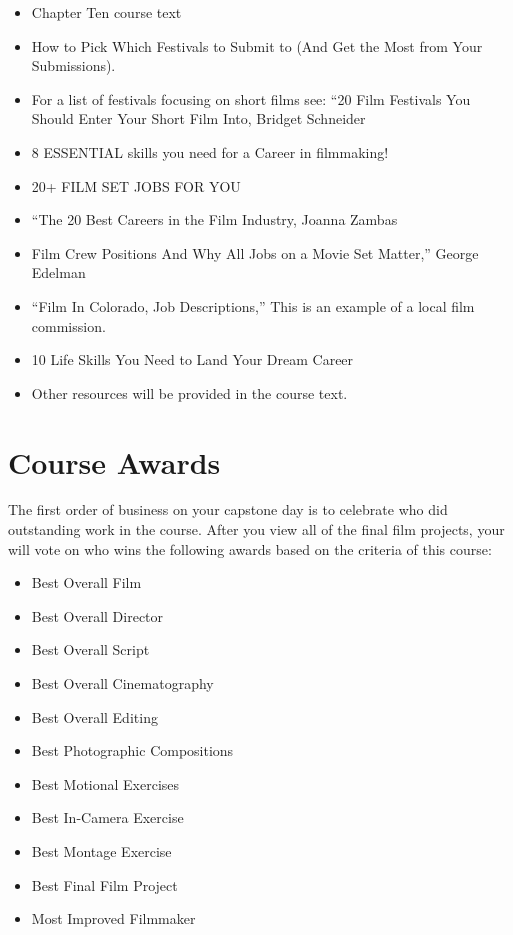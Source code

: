 \documentclass[
  letterpaper,
  DIV=11,
  numbers=noendperiod]{scrreprt}
\providecommand{\tightlist}{%
  \setlength{\itemsep}{0pt}\setlength{\parskip}{0pt}}\usepackage{longtable,booktabs,array}
\begin{document}
\begin{itemize}
\tightlist
\item
  Chapter Ten course text
\item
  How to Pick Which Festivals to Submit to (And Get the Most from Your
  Submissions).
\item
  For a list of festivals focusing on short films see: ``20 Film
  Festivals You Should Enter Your Short Film Into, Bridget Schneider
\item
  8 ESSENTIAL skills you need for a Career in filmmaking!
\item
  20+ FILM SET JOBS FOR YOU
\item
  ``The 20 Best Careers in the Film Industry, Joanna Zambas
\item
  Film Crew Positions And Why All Jobs on a Movie Set Matter,'' George
  Edelman
\item
  ``Film In Colorado, Job Descriptions,'' This is an example of a local
  film commission.
\item
  10 Life Skills You Need to Land Your Dream Career
\item
  Other resources will be provided in the course text.
\end{itemize}

\section{Course Awards}\label{course-awards}

The first order of business on your capstone day is to celebrate who did
outstanding work in the course. After you view all of the final film
projects, your will vote on who wins the following awards based on the
criteria of this course:

\begin{itemize}
\tightlist
\item
  Best Overall Film
\item
  Best Overall Director
\item
  Best Overall Script
\item
  Best Overall Cinematography
\item
  Best Overall Editing
\item
  Best Photographic Compositions
\item
  Best Motional Exercises
\item
  Best In-Camera Exercise
\item
  Best Montage Exercise
\item
  Best Final Film Project
\item
  Most Improved Filmmaker
\end{itemize}
\end{document}
